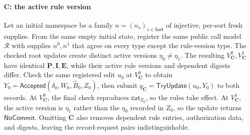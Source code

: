 \paragraph{\(\mathbf C\): the active rule version}
Let an initial namespace be a family \(n=(n_s)_{s\in\mathsf{Sort}}\) of injective, per-sort fresh supplies.
From the same empty initial state, register the same public call model \(\mathcal R\) with supplies \(n^0,n^1\) that agree on every type except the rule-version type.
The checked root updates create distinct active versions \(\eta_0\ne\eta_1\).
The resulting \(V_{\mathbf C}^0,V_{\mathbf C}^1\) have identical \(\mathbf P,\mathbf I,\mathbf E\), while their active rule versions and dependent digests differ.
Check the same registered edit \(u_0\) at \(V_{\mathbf C}^0\) to obtain \(Y_0=\mathsf{Accepted}(\delta_0,W_0,\widehat B_0,Z_0)\), then submit \(q_{\mathbf C}=\mathsf{TryUpdate}(u_0,Y_0)\) to both records.
At \(V_{\mathbf C}^0\), the final check reproduces \(\mathsf{cut}_{Z_0}\), so the rules take effect.
At \(V_{\mathbf C}^1\), the active version is \(\eta_1\) rather than the \(\eta_0\) recorded in \(Z_0\), so the update returns \(\mathsf{NoCommit}\).
Omitting \(\mathbf C\) also removes dependent rule entries, authorization data, and digests, leaving the record-request pairs indistinguishable.

